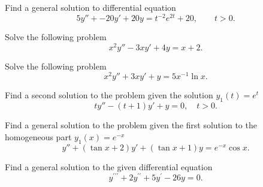 \documentclass[11pt]{article}
\begin{document}
\begin{problem}
Find a general solution to differential equation
\begin{equation*}
5y'' + -20 y' +20 y = t^{-2}e^{2t}+20, \qquad t>0.
\end{equation*}
\end{problem}




\begin{problem}
Solve the following problem
\begin{equation*}
     x^{2}y''-3xy'+4y=x+2.
\end{equation*}
\end{problem}


\begin{problem}
Solve the following problem
\begin{equation*}     
     x^{2}y''+3xy'+y=5x^{-1}\ln x.
\end{equation*}
\end{problem}




\begin{problem}
Find a second solution to the problem given the solution $y_{1}(t)=e^{t}$
\begin{equation*}
ty''-(t+1)y'+y=0, \quad t>0.
\end{equation*}
\end{problem}


\begin{problem}
Find a general solution to the problem given the first solution to the homogeneous part $y_{1}(x)=e^{-x}$
\begin{equation*}
y''+(\tan x +2)y'+(\tan x+1)y=e^{-x}\cos x.
\end{equation*}
\end{problem}


\begin{problem}
Find a general solution to the given differential equation
\begin{equation*}
y^{\prime \prime \prime}+2y^{\prime \prime} + 5 y^{\prime} -26 y =0.
\end{equation*}
\end{problem}







\end{document}
